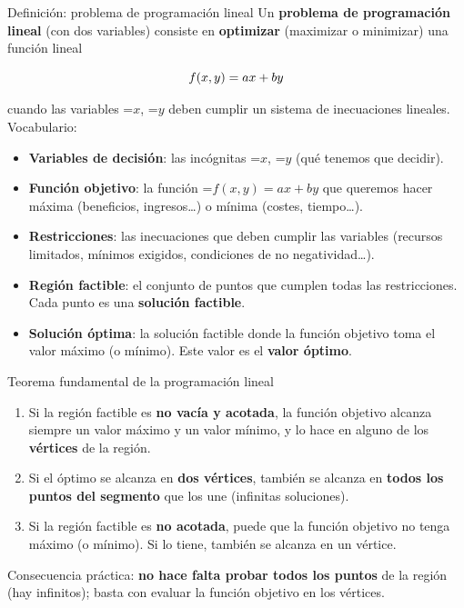 \documentclass[11pt,a4paper]{article}
\newcommand{\fmm}[1]{\setbox0=\hbox{$#1$}\ifdim\wd0>\linewidth\fmdisp{#1}\else\mbox{\box0}\fi}
\newcommand{\fmdisp}[1]{\[\setbox2=\hbox{$\displaystyle #1$}\ifdim\wd2>\linewidth\resizebox{\linewidth}{!}{\box2}\else\box2\fi\]}
\begin{document}
\begin{fmdef}{Definición: problema de programación lineal}
Un \textbf{problema de programación lineal} (con dos variables) consiste en \textbf{optimizar} (maximizar o minimizar) una función lineal

\fmdisp{f(x,y)=ax+by}

cuando las variables \fmm{x}, \fmm{y} deben cumplir un sistema de inecuaciones lineales. Vocabulario:

\begin{itemize}
\item \textbf{Variables de decisión}: las incógnitas \fmm{x}, \fmm{y} (qué tenemos que decidir).
\item \textbf{Función objetivo}: la función \fmm{f(x,y)=ax+by} que queremos hacer máxima (beneficios, ingresos\dots{}) o mínima (costes, tiempo\dots{}).
\item \textbf{Restricciones}: las inecuaciones que deben cumplir las variables (recursos limitados, mínimos exigidos, condiciones de no negatividad\dots{}).
\item \textbf{Región factible}: el conjunto de puntos que cumplen todas las restricciones. Cada punto es una \textbf{solución factible}.
\item \textbf{Solución óptima}: la solución factible donde la función objetivo toma el valor máximo (o mínimo). Este valor es el \textbf{valor óptimo}.
\end{itemize}
\end{fmdef}

\begin{fmprop}{Teorema fundamental de la programación lineal}
\begin{enumerate}
\item Si la región factible es \textbf{no vacía y acotada}, la función objetivo alcanza siempre un valor máximo y un valor mínimo, y lo hace en alguno de los \textbf{vértices} de la región.
\item Si el óptimo se alcanza en \textbf{dos vértices}, también se alcanza en \textbf{todos los puntos del segmento} que los une (infinitas soluciones).
\item Si la región factible es \textbf{no acotada}, puede que la función objetivo no tenga máximo (o mínimo). Si lo tiene, también se alcanza en un vértice.
\end{enumerate}

\begin{fmnote}Consecuencia práctica: \textbf{no hace falta probar todos los puntos} de la región (hay infinitos); basta con evaluar la función objetivo en los vértices.\end{fmnote}
\end{fmprop}
\end{document}
